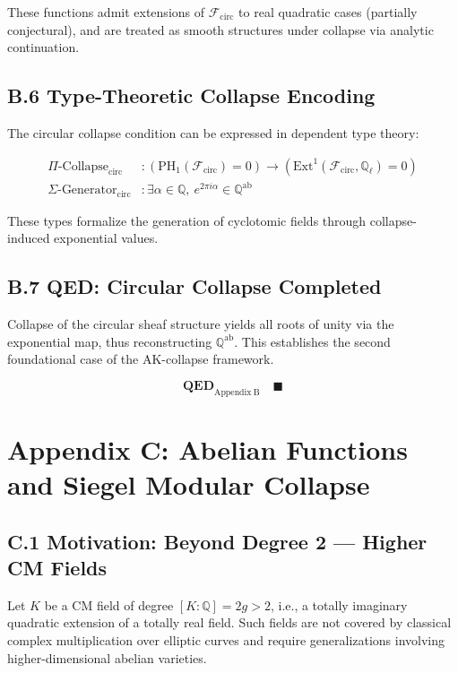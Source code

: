 \documentclass[11pt]{article}
\begin{document}
These functions admit extensions of \( \mathcal{F}_{\mathrm{circ}} \) to real quadratic cases (partially conjectural), and are treated as smooth structures under collapse via analytic continuation.

\subsection*{B.6 Type-Theoretic Collapse Encoding}

The circular collapse condition can be expressed in dependent type theory:

\begin{align*}
\Pi\text{-Collapse}_{\mathrm{circ}} &\colon \left( \mathrm{PH}_1(\mathcal{F}_{\mathrm{circ}}) = 0 \right) \rightarrow \left( \mathrm{Ext}^1(\mathcal{F}_{\mathrm{circ}}, \mathbb{Q}_\ell) = 0 \right) \\
\Sigma\text{-Generator}_{\mathrm{circ}} &\colon \exists \alpha \in \mathbb{Q},\ e^{2\pi i \alpha} \in \mathbb{Q}^{\mathrm{ab}}
\end{align*}

These types formalize the generation of cyclotomic fields through collapse-induced exponential values.

\subsection*{B.7 QED: Circular Collapse Completed}

Collapse of the circular sheaf structure yields all roots of unity via the exponential map, thus reconstructing \( \mathbb{Q}^{\mathrm{ab}} \).  
This establishes the second foundational case of the AK-collapse framework.

\[
\textbf{QED}_{\mathrm{Appendix\ B}} \quad \blacksquare
\]



\appendix
\section*{Appendix C: Abelian Functions and Siegel Modular Collapse}

\subsection*{C.1 Motivation: Beyond Degree 2 — Higher CM Fields}

Let \( K \) be a CM field of degree \( [K:\mathbb{Q}] = 2g > 2 \), i.e., a totally imaginary quadratic extension of a totally real field.  
Such fields are not covered by classical complex multiplication over elliptic curves and require generalizations involving higher-dimensional abelian varieties.
\end{document}
